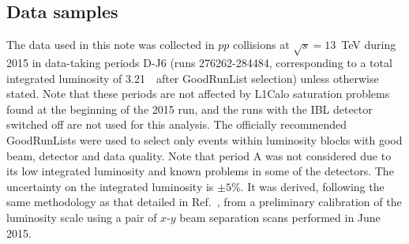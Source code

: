 \subsection{Data samples}

The data used in this note was collected in $pp$ collisions at $\sqrt{s}=13$~TeV during 2015 
in data-taking periods D-J6 (runs 276262-284484, 
corresponding to a total integrated luminosity of 3.21~\ifb\ after GoodRunList selection) unless otherwise stated. 
Note that these periods are not affected by L1Calo saturation problems found at the beginning of the 2015 run, 
and the runs with the IBL detector switched off are not used for this analysis.
The officially recommended GoodRunLists were used to select only events within luminosity blocks with good beam, detector and data quality. 
Note that period A was not considered due to its low integrated luminosity and known problems in some of the detectors. 
The uncertainty on the integrated luminosity is $\pm5\%$. 
It was derived, following the same methodology as that detailed in Ref.~\cite{DAPR-2011-01}, 
from a preliminary calibration of the luminosity scale using a pair of $x$-$y$ beam separation scans performed in June 2015. 

